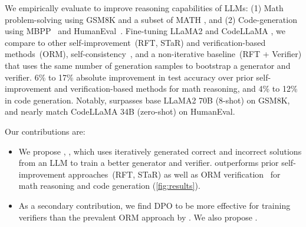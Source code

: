 


We empirically evaluate \vstar{} to improve reasoning capabilities of LLMs: (1) Math problem-solving using GSM8K \citep{DBLP:journals/corr/abs-2110-14168} and a subset of MATH \citep{DBLP:conf/nips/HendrycksBKABTS21}, and (2) Code-generation using MBPP~\citep{austin2021program} and HumanEval~\citep{chen2021codex}. Fine-tuning LLaMA2 \citep{DBLP:journals/corr/abs-2307-09288} and CodeLLaMA \citep{DBLP:journals/corr/abs-2308-12950}, we compare \vstar{} to other self-improvement~(RFT, STaR) and verification-based methods~(ORM), self-consistency~\citep{wang2023making}, and a non-iterative \vstar{} baseline~(RFT + Verifier) that uses the same number of generation samples to bootstrap a generator and verifier. 
 6\% to 17\% absolute improvement in test accuracy over prior self-improvement and verification-based methods for math reasoning, and 4\% to 12\% in code generation. Notably,  surpasses base LLaMA2 70B (8-shot) on GSM8K, and nearly match CodeLLaMA 34B (zero-shot) on HumanEval.

Our contributions are:
\begin{itemize}[left=0pt,nosep]
    \item We propose \vstar{}, , which uses iteratively generated correct and incorrect solutions from an LLM to train a better generator and verifier. \vstar{} outperforms prior self-improvement approaches~(RFT, STaR) as well as ORM verification~\citep{DBLP:journals/corr/abs-2110-14168}  for math reasoning and code generation (\autoref{fig:results}). 
    \item As a secondary contribution, we find DPO to
    be more effective for training verifiers than the prevalent ORM approach by \citet{DBLP:journals/corr/abs-2110-14168}. We also propose .
\end{itemize}


